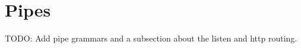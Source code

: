 \documentclass[./LRM_main.tex]{subfiles}
\begin{document}
\section{Pipes}
TODO: Add pipe grammars and a subsection about the listen and http routing.
\begin{comment}
Async control flow is incredibly useful when dealing with I/O operations, which are the foundation of web-based programming. When restricted to a single-threaded and single-process model, I/O operations in a programming language are blocking forcing the program to wait for a potentially unbounded time. Introduce multi-threading or multi-process models, and a programming language becomes much more complex. The single-threaded asynchronous control flow model simplifies dealing with I/O operations such that the program does not.


\subsection{My First Pipeline}
Consider the following example pipeline:


\end{comment}
\end{document}
